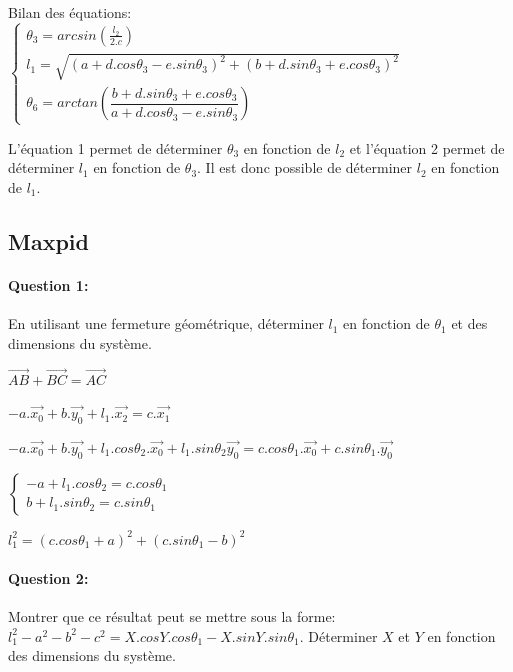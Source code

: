 Bilan des équations:
\begin{math}
\left\{\begin{array}{l}
\theta_3=arcsin\left(\frac{l_2}{2.c}\right)\\
l_1=\sqrt{(a+d.cos\theta_3-e.sin\theta_3)^2+(b+d.sin\theta_3+e.cos\theta_3)^2}\\
\theta_6=arctan\left(\dfrac{b+d.sin\theta_3+e.cos\theta_3}{a+d.cos\theta_3-e.sin\theta_3}\right)
\end{array}\right.
\end{math}

L'équation 1 permet de déterminer $\theta_3$ en fonction de $l_2$ et l'équation 2 permet de déterminer $l_1$ en fonction de $\theta_3$. Il est donc possible de déterminer $l_2$ en fonction de $l_1$.

\subsection{Maxpid}

\paragraph{Question 1:} En utilisant une fermeture géométrique, déterminer $l_1$ en fonction de $\theta_1$ et des dimensions du système.

$\overrightarrow{AB}+\overrightarrow{BC}=\overrightarrow{AC}$

$-a.\overrightarrow{x_0}+b.\overrightarrow{y_0}+l_1.\overrightarrow{x_2}=c.\overrightarrow{x_1}$

$-a.\overrightarrow{x_0}+b.\overrightarrow{y_0}+l_1.cos\theta_2.\overrightarrow{x_0}+l_1.sin\theta_2\overrightarrow{y_0}=c.cos\theta_1.\overrightarrow{x_0}+c.sin\theta_1.\overrightarrow{y_0}$

\begin{math}
\left\{
\begin{array}{l}
-a+l_1.cos\theta_2=c.cos\theta_1\\
b+l_1.sin\theta_2=c.sin\theta_1
\end{array}\right.
\end{math}

$l_1^2=(c.cos\theta_1+a)^2+(c.sin\theta_1-b)^2$

\paragraph{Question 2:} Montrer que ce résultat peut se mettre sous la forme: $l_1^2-a^2-b^2-c^2=X.cos Y.cos\theta_1-X.sin Y.sin\theta_1$. Déterminer $X$ et $Y$ en fonction des dimensions du système.

